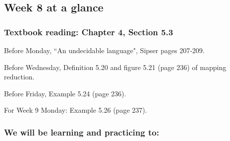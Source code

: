

\subsection*{Week 8 at a glance}


\vspace{-20pt}

\subsubsection*{Textbook reading: Chapter 4, Section 5.3}

\vspace{-20pt}

Before Monday, ``An undecidable language", Sipser pages 207-209.

Before Wednesday, Definition 5.20 and figure 5.21 (page 236) of mapping reduction.

Before Friday, Example 5.24 (page 236).

For Week 9 Monday: Example 5.26 (page 237).

\vspace{-20pt}

\subsubsection*{We will be learning and practicing to:}

\vspace{-20pt}

